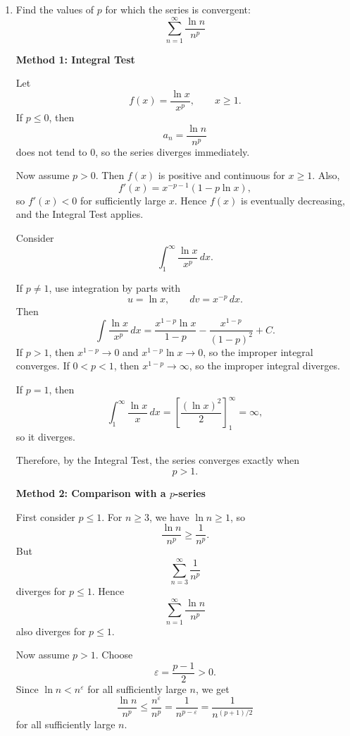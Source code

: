 \documentclass[a4paper,12pt,twocolumn]{article}
\newenvironment{solutionbox}{\begin{framed}}{\end{framed}}
\begin{document}
\begin{enumerate}[label=\textbf{\arabic*.}, leftmargin=2em, itemsep=1.2em]
\begin{solutionbox}
\medskip
\textbf{Answer:}
\[
\boxed{\text{The series converges exactly for } p>1.}
\]
\end{solutionbox}

\setcounter{enumi}{33}
\item Find the values of \(p\) for which the series is convergent:
\[
\sum_{n=1}^{\infty}\frac{\ln n}{n^p}
\]

\begin{solutionbox}
\textbf{Method 1: Integral Test}

Let
\[
f(x)=\frac{\ln x}{x^p}, \qquad x\ge 1.
\]
If \(p\le 0\), then
\[
a_n=\frac{\ln n}{n^p}
\]
does not tend to \(0\), so the series diverges immediately.

Now assume \(p>0\). Then \(f(x)\) is positive and continuous for \(x\ge 1\). Also,
\[
f'(x)=x^{-p-1}(1-p\ln x),
\]
so \(f'(x)<0\) for sufficiently large \(x\). Hence \(f(x)\) is eventually decreasing, and the Integral Test applies.

Consider
\[
\int_1^\infty \frac{\ln x}{x^p}\,dx.
\]

If \(p\neq 1\), use integration by parts with
\[
u=\ln x, \qquad dv=x^{-p}\,dx.
\]
Then
\[
\int \frac{\ln x}{x^p}\,dx
=
\frac{x^{1-p}\ln x}{1-p}-\frac{x^{1-p}}{(1-p)^2}+C.
\]
If \(p>1\), then \(x^{1-p}\to 0\) and \(x^{1-p}\ln x\to 0\), so the improper integral converges.
If \(0<p<1\), then \(x^{1-p}\to\infty\), so the improper integral diverges.

If \(p=1\), then
\[
\int_1^\infty \frac{\ln x}{x}\,dx
=
\left[\frac{(\ln x)^2}{2}\right]_1^\infty
=\infty,
\]
so it diverges.

Therefore, by the Integral Test, the series converges exactly when
\[
p>1.
\]
\end{solutionbox}

\begin{solutionbox}
\textbf{Method 2: Comparison with a \(p\)-series}

First consider \(p\le 1\). For \(n\ge 3\), we have \(\ln n\ge 1\), so
\[
\frac{\ln n}{n^p}\ge \frac{1}{n^p}.
\]
But
\[
\sum_{n=3}^{\infty}\frac{1}{n^p}
\]
diverges for \(p\le 1\). Hence
\[
\sum_{n=1}^{\infty}\frac{\ln n}{n^p}
\]
also diverges for \(p\le 1\).

Now assume \(p>1\). Choose
\[
\varepsilon=\frac{p-1}{2}>0.
\]
Since \(\ln n<n^\varepsilon\) for all sufficiently large \(n\), we get
\[
\frac{\ln n}{n^p}
\le
\frac{n^\varepsilon}{n^p}
=
\frac{1}{n^{p-\varepsilon}}
=
\frac{1}{n^{(p+1)/2}}
\]
for all sufficiently large \(n\).


\end{solutionbox}
\end{enumerate}
\end{document}
